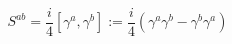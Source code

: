 \begin{equation}
S^{ab} = \frac{i}{4} [\gamma^a, \gamma^b ] := \frac{i}{4} (\gamma^a \gamma^b - \gamma^b \gamma^a)
\label{sab}
\end{equation}

